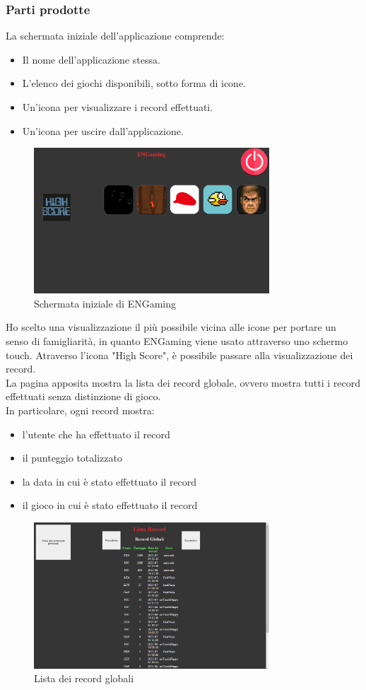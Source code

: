 \subsubsection{Parti prodotte}
La schermata iniziale dell'applicazione comprende:
\begin{itemize}
    \item Il nome dell'applicazione stessa.
    \item L'elenco dei giochi disponibili, sotto forma di icone.
    \item Un'icona per visualizzare i record effettuati.
    \item Un'icona per uscire dall'applicazione.
\end{itemize}
\begin{figure}[h]
    \centering
    \includegraphics[width=250pt]{images/product/schermataIniziale.png}
    \caption{Schermata iniziale di ENGaming}
    \label{fig:schermataIniziale}
\end{figure}
Ho scelto una visualizzazione il più possibile vicina alle icone per portare un senso di famigliarità, in quanto ENGaming viene usato attraverso uno schermo touch.
\newpage
Atraverso l'icona "High Score", è possibile passare alla visualizzazione dei record.\\
La pagina apposita mostra la lista dei record globale, ovvero mostra tutti i record effettuati senza distinzione di gioco.\\
In particolare, ogni record mostra:
\begin{itemize}
    \item l'utente che ha effettuato il record
    \item il punteggio totalizzato
    \item la data in cui è stato effettuato il record
    \item il gioco in cui è stato effettuato il record
\end{itemize}
\begin{figure}[h]
    \centering
    \includegraphics[width=250pt]{images/product/schermataRecord.png}
    \caption{Lista dei record globali}
    \label{fig:schermataRecord}
\end{figure}
